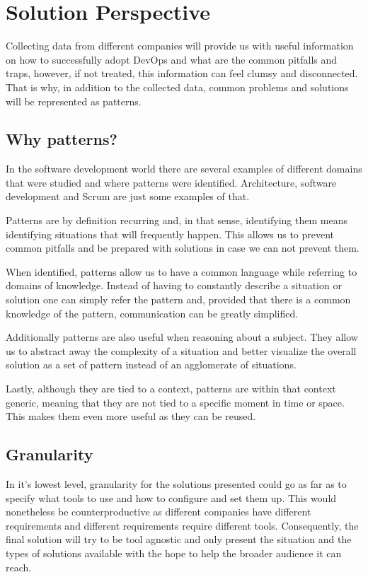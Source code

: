         
        \section{Solution Perspective}

		Collecting data from different companies will provide us with useful information on how to successfully adopt DevOps and what are the common pitfalls and traps, however, if not treated, this information can feel clumsy and disconnected. That is why, in addition to the collected data, common problems and solutions will be represented as patterns.  
    
    		\subsection{Why patterns?}
      		In the software development world there are several examples of different domains that were studied and where patterns were identified. Architecture, software development and Scrum are just some examples of that.
      
    		Patterns are by definition recurring and, in that sense, identifying them means identifying situations that will frequently happen. This allows us to prevent common pitfalls and be prepared with solutions in case we can not prevent them.
    
   	 		When identified, patterns allow us to have a common language while referring to domains of knowledge. Instead of having to constantly describe a situation or solution one can simply refer the pattern and, provided that there is a common knowledge of the pattern, communication can be greatly simplified.
    
    		Additionally patterns are also useful when reasoning about a subject. They allow us to abstract away the complexity of a situation and better visualize the overall solution as a set of pattern instead of an agglomerate of situations.
    
    		Lastly, although they are tied to a context, patterns are within that context generic, meaning that they are not tied to a specific moment in time or space. This makes them even more useful as they can be reused.
    
    		\subsection{Granularity}
    		In it's lowest level, granularity for the solutions presented could go as far as to specify what tools to use and how to configure and set them up. This would nonetheless be counterproductive as different companies have different requirements and different requirements require different tools. Consequently, the final solution will try to be tool agnostic and only present the situation and the types of solutions available with the hope to help the broader audience it can reach.

